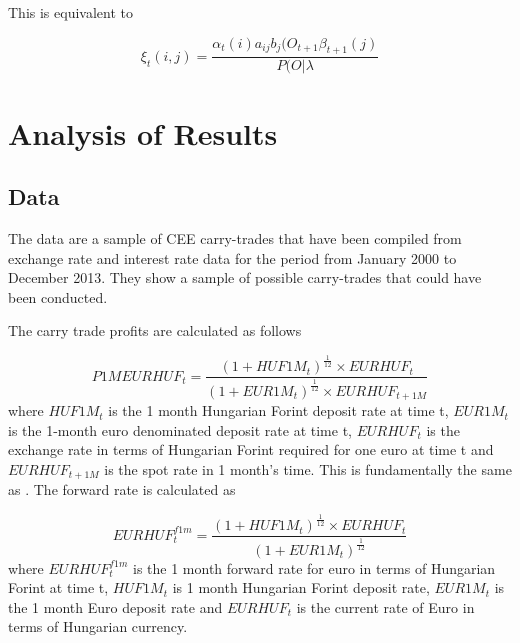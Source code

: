 \documentclass[12pt, a4paper, oneside]{article} %
\begin{document}
This is equivalent to 

\begin{equation}
\xi_t(i,j) = \frac{\alpha_t(i)a_{ij}b_j(O_{t+1}\beta_{t+1}(j)}{P(O|\lambda}
\end{equation}


\section{Analysis of Results}
\subsection{Data}
The data are a sample of CEE carry-trades that have been compiled from exchange rate and interest rate data for the period from January 2000 to December 2013.  They show a sample of possible carry-trades that could have been conducted. 

The carry trade profits are calculated as follows

\begin{equation}\label{eqref:carryprofit}
P1MEURHUF_t = \frac{(1 + HUF1M_t)^{\frac{1}{12}} \times EURHUF_t }{(1 + EUR1M_t)^{\frac{1}{12}} \times EURHUF_{t+1M}}
\end{equation}
where $HUF1M_t$ is the 1 month Hungarian Forint deposit rate at time t, $EUR1M_t$ is the 1-month euro denominated deposit rate at time t, $EURHUF_t$ is the exchange rate in terms of  Hungarian Forint required for one euro at time t and  $EURHUF_{t+1M}$ is the spot rate in 1 month's time.  This is fundamentally the same as \citep{BrunnermeierCarry}. The forward rate is calculated as

\begin{equation}\label{eqref:forward}
EURHUF_t^{f1m} = \frac{(1 + HUF1M_t)^{\frac{1}{12}} \times EURHUF_t }{(1 + EUR1M_t)^{\frac{1}{12}}}
\end{equation}
where  $EURHUF_t^{f1m}$ is the 1 month forward rate for euro in terms of Hungarian Forint at time t, $HUF1M_t$ is 1 month Hungarian Forint deposit rate, $EUR1M_t$ is the 1 month Euro deposit rate and $EURHUF_t$ is the current rate of Euro in terms of Hungarian currency.  

\end{document}
